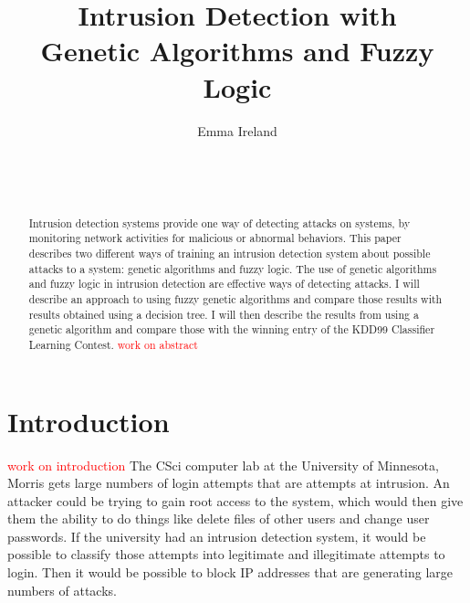 \documentclass{sig-alternate}
\newcommand{\mycomment}[1]{\textcolor{red}{#1}}
\begin{document}

\title{Intrusion Detection with \\ Genetic Algorithms and Fuzzy Logic}


\author{
\alignauthor
Emma Ireland\\
	\\
	\\
	\\
}

\maketitle
\begin{abstract}
Intrusion detection systems provide one way of detecting attacks on systems, by monitoring network activities for malicious or abnormal behaviors. This paper describes two different ways of training an intrusion detection system about possible attacks to a system: genetic algorithms and fuzzy logic. The use of genetic algorithms and fuzzy logic in intrusion detection are effective ways of detecting attacks. I will describe an approach to using fuzzy genetic algorithms and compare those results with results obtained using a decision tree. I will then describe the results from using a genetic algorithm and compare those with the winning entry of the KDD99 Classifier Learning Contest.
\mycomment{work on abstract}

\end{abstract}




\section{Introduction}
 \mycomment{work on introduction} The CSci computer lab at the University of Minnesota, Morris gets large numbers of login attempts that are attempts at intrusion. An attacker could be trying to gain root access to the system, which would then give them the ability to do things like delete files of other users and change user passwords. If the university had an intrusion detection system, it would be possible to classify those attempts into legitimate and illegitimate attempts to login. Then it would be possible to block IP addresses that are generating large numbers of attacks.
\end{document}
